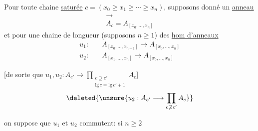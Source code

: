 Pour toute chaine \uline{saturée} $c=(x_0\geq x_1\geq\cdots\geq x_n)$, supposons donné un \uline{anneau}
\[\begin{aligned}\longrightarrow\\A_c=A_{[x_0,\ldots,x_n]}\end{aligned}\]
et pour une chaine de longueur  (supposons $n\geq1$) des \uline{hom d'anneaux}
\[
\begin{aligned}
u_1:\quad&A_{[x_0,\ldots,x_{n-1}]}\longrightarrow A_{[x_0,\ldots,x_n]}\\
u_2:\quad&A_{[x_1,\ldots,x_n]}\longrightarrow A_{[x_0,\ldots,x_n]}
\end{aligned}
\]

[de sorte que $u_1,u_2:A_{c'}\longrightarrow\displaystyle\prod_{\substack{c\supseteq c'\\\mathrm{lg}\,c=\mathrm{lg}\,c'+1}}A_c$]
\[\deleted{\unsure{u_2:A_{c'}\longrightarrow\prod_{c\not\supset c'} A_c}}\]

on suppose que $u_1$ et $u_2$ commutent: si $n\geq2$

